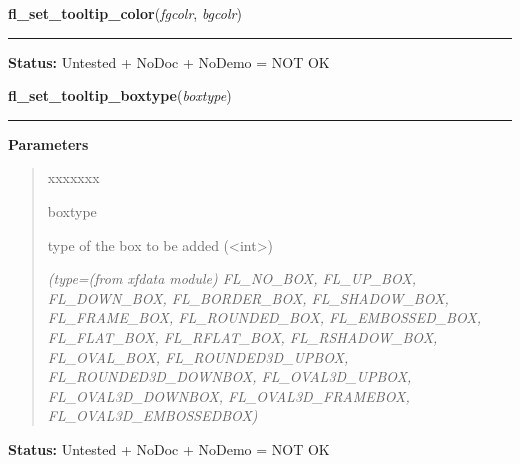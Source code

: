     \label{xformslib:flgoodies:fl_set_tooltip_color}

    \vspace{0.5ex}

\hspace{.8\funcindent}\begin{boxedminipage}{\funcwidth}

    \raggedright \textbf{fl\_set\_tooltip\_color}(\textit{fgcolr}, \textit{bgcolr})

    \vspace{-1.5ex}

    \rule{\textwidth}{0.5\fboxrule}
\setlength{\parskip}{2ex}
\setlength{\parskip}{1ex}
\textbf{Status:} Untested + NoDoc + NoDemo = NOT OK



    \end{boxedminipage}

    \label{xformslib:flgoodies:fl_set_tooltip_boxtype}

    \vspace{0.5ex}

\hspace{.8\funcindent}\begin{boxedminipage}{\funcwidth}

    \raggedright \textbf{fl\_set\_tooltip\_boxtype}(\textit{boxtype})

    \vspace{-1.5ex}

    \rule{\textwidth}{0.5\fboxrule}
\setlength{\parskip}{2ex}
\setlength{\parskip}{1ex}
      \textbf{Parameters}
      \vspace{-1ex}

      \begin{quote}
        \begin{Ventry}{xxxxxxx}

          \item[boxtype]

          type of the box to be added ({\textless}int{\textgreater})

            {\it (type=(from xfdata module) FL\_NO\_BOX, FL\_UP\_BOX, FL\_DOWN\_BOX, 
FL\_BORDER\_BOX, FL\_SHADOW\_BOX, FL\_FRAME\_BOX, FL\_ROUNDED\_BOX, 
FL\_EMBOSSED\_BOX, FL\_FLAT\_BOX, FL\_RFLAT\_BOX, FL\_RSHADOW\_BOX, 
FL\_OVAL\_BOX, FL\_ROUNDED3D\_UPBOX, FL\_ROUNDED3D\_DOWNBOX, 
FL\_OVAL3D\_UPBOX, FL\_OVAL3D\_DOWNBOX, FL\_OVAL3D\_FRAMEBOX, 
FL\_OVAL3D\_EMBOSSEDBOX)}

        \end{Ventry}

      \end{quote}

\textbf{Status:} Untested + NoDoc + NoDemo = NOT OK



    \end{boxedminipage}

